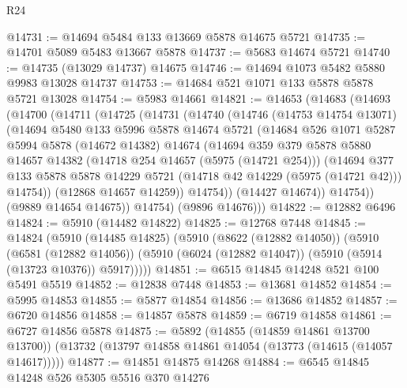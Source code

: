 \begin{lexlean}{R24}
\begin{coremodule}
@14731 := @14694 @5484 @133 @13669 @5878 @14675 @5721
@14735 := @14701 @5089 @5483 @13667 @5878
@14737 := @5683 @14674 @5721
@14740 := @14735 (@13029 @14737) @14675
@14746 := @14694 @1073 @5482 @5880 @9983 @13028 @14737
@14753 := @14684 @521 @1071 @133 @5878 @5878 @5721 @13028
@14754 := @5983 @14661
@14821 := @14653
    (@14683
      (@14693
        (@14700
          (@14711
            (@14725
              (@14731
                (@14740
                  (@14746
                    (@14753 @14754 @13071)
                    (@14694
                      @5480
                      @133
                      @5996
                      @5878
                      @14674
                      @5721
                      (@14684
                        @526
                        @1071
                        @5287
                        @5994
                        @5878
                        (@14672 @14382)
                        @14674
                        (@14694
                          @359
                          @379
                          @5878
                          @5880
                          @14657
                          @14382
                          (@14718 @254 @14657 (@5975 (@14721 @254)))
                          (@14694
                            @377
                            @133
                            @5878
                            @5878
                            @14229
                            @5721
                            (@14718 @42 @14229 (@5975 (@14721 @42)))
                            @14754))
                        (@12868 @14657 @14259))
                      @14754))
                  (@14427 @14674))
                @14754))
            (@9889 @14654 @14675))
          @14754)
        (@9896 @14676)))
@14822 := @12882 @6496
@14824 := @5910 (@14482 @14822)
@14825 := @12768 @7448
@14845 := @14824
    (@5910
      (@14485 @14825)
      (@5910
        (@8622 (@12882 @14050))
        (@5910
          (@6581 (@12882 @14056))
          (@5910 (@6024 (@12882 @14047)) (@5910 (@5914 (@13723 @10376)) @5917)))))
@14851 := @6515 @14845 @14248 @521 @100 @5491 @5519
@14852 := @12838 @7448
@14853 := @13681 @14852
@14854 := @5995 @14853
@14855 := @5877 @14854
@14856 := @13686 @14852
@14857 := @6720 @14856
@14858 := @14857 @5878
@14859 := @6719 @14858
@14861 := @6727 @14856 @5878
@14875 := @5892
    (@14855 (@14859 @14861 @13700 @13700))
    (@13732 (@13797 @14858 @14861 @14054 (@13773 (@14615 (@14057 @14617)))))
@14877 := @14851 @14875 @14268
@14884 := @6545 @14845 @14248 @526 @5305 @5516 @370 @14276

\end{coremodule}
\end{lexlean}
